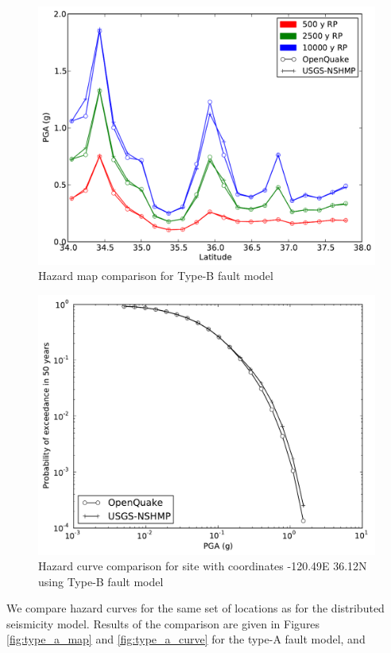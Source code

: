 \begin{figure}[!ht]
\centering
\includegraphics[width=12.5cm]{./qareport/pictures/oq_nshmp_bFault_ar1.pdf}
\caption{Hazard map comparison for Type-B fault model}
\label{fig:type_b_map}
\end{figure}
\begin{figure}[!h]
\centering
\includegraphics[width=12.5cm]{./qareport/pictures/-120pt49_36pt12_bFault_ar1.pdf}
\caption{Hazard curve comparison for site with coordinates -120.49E 36.12N using Type-B fault model}
\label{fig:type_b_curve}
\end{figure}
%
We compare hazard curves for the same set of locations as for the distributed
seismicity model. Results of the comparison are given in Figures
\ref{fig:type_a_map} and \ref{fig:type_a_curve} for the type-A fault model, and
